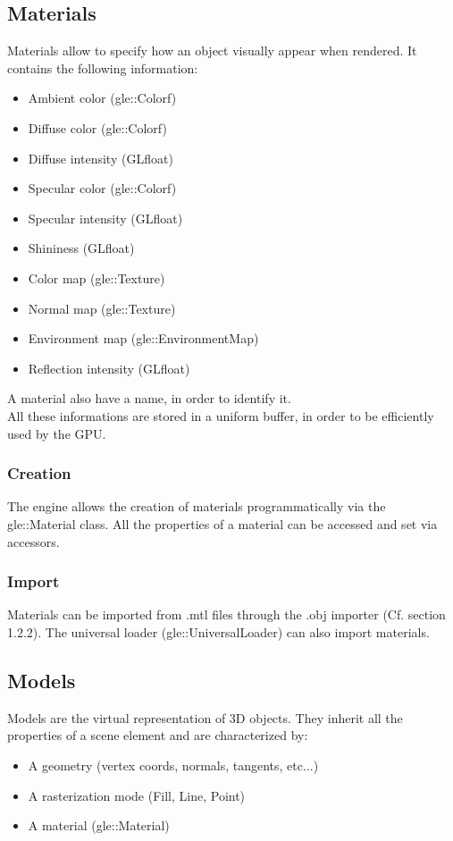 \documentclass [a4 paper,11pt]{report}
\begin{document}
\subsection{Materials}
Materials allow to specify how an object visually appear when rendered. It contains the following information:
\begin{itemize}
\item Ambient color (gle::Colorf)
\item Diffuse color (gle::Colorf)
\item Diffuse intensity (GLfloat)
\item Specular color (gle::Colorf)
\item Specular intensity (GLfloat)
\item Shininess (GLfloat)
\item Color map (gle::Texture)
\item Normal map (gle::Texture)
\item Environment map (gle::EnvironmentMap)
\item Reflection intensity (GLfloat)
\end{itemize}
A material also have a name, in order to identify it.\\
All these informations are stored in a uniform buffer, in order to be efficiently used by the GPU.

\subsubsection{Creation}
The engine allows the creation of materials programmatically via the gle::Material class. All the properties of a material can be accessed and set via accessors.
\subsubsection{Import}
Materials can be imported from .mtl files through the .obj importer (Cf. section 1.2.2). The universal loader (gle::UniversalLoader) can also import materials.

\subsection{Models}
Models are the virtual representation of 3D objects. They inherit all the properties of a scene element and are characterized by:
\begin{itemize}
\item A geometry (vertex coords, normals, tangents, etc...)
\item A rasterization mode (Fill, Line, Point)
\item A material (gle::Material)
\end{itemize}
\end{document}
